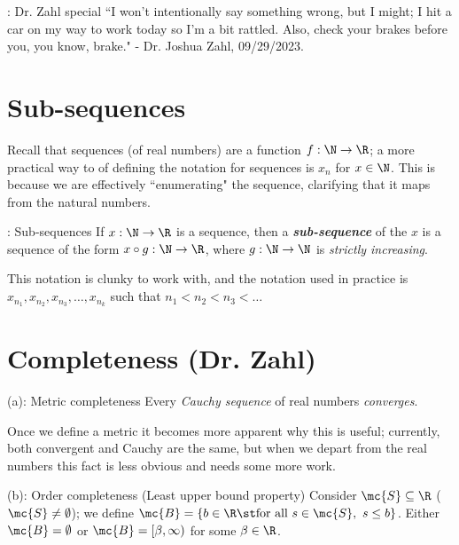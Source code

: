 \clearpage
\begin{nquote}{: Dr. Zahl special}
	``I won't intentionally say something wrong, but I might; I hit a car on my way to work today so I'm a bit rattled. Also, check your brakes before you, you know, brake." - Dr. Joshua Zahl, 09/29/2023.
\end{nquote}

\section{Sub-sequences}
Recall that sequences (of real numbers) are a function \(f:\N\to\R\); a more practical way to of defining the notation for sequences is \(x_n\) for \(x\in\N\). This is because we are effectively ``enumerating" the sequence, clarifying that it maps from the natural numbers. 
\begin{ndef}{: Sub-sequences}
	If \(x:\N\to\R\) is a sequence, then a \emph{\textbf{sub-sequence}} of the \(x\) is a sequence of the form \(x\circ g:\N\to\R\), where \(g:\N\to\N\) is \emph{strictly increasing}.
\end{ndef}
\begin{notation}
	This notation is clunky to work with, and the notation used in practice is \(x_{n_1},x_{n_2},x_{n_3},\dots,x_{n_k}\) such that \(n_1<n_2<n_3<\dots\)
\end{notation}

\clearpage

\section{Completeness (Dr. Zahl)}
\begin{nproperty}{ (a): Metric completeness}
	Every \emph{Cauchy sequence} of real numbers \emph{converges}.
\end{nproperty}
\begin{note}
	Once we define a metric it becomes more apparent why this is useful; currently, both convergent and Cauchy are the same, but when we depart from the real numbers this fact is less obvious and needs some more work.
\end{note}
\begin{nproperty}{ (b): Order completeness (Least upper bound property)}
	Consider \(\mc{S}\subseteq\R\) (\(\mc{S}\neq\emptyset\)); we define \(\mc{B}=\{b\in\R\st\text{for all}~s\in\mc{S},~s\leq b\}\). Either \(\mc{B}=\emptyset\) or \(\mc{B}=[\beta,\infty)\) for some \(\beta\in\R\).
\end{nproperty}

